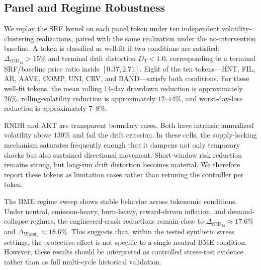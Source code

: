 \documentclass[a4paper,fleqn]{cas-dc}
\begin{document}
\subsection{Panel and Regime Robustness}
\label{sec:exp-generalization}

We replay the SRF kernel on each panel token under ten independent volatility-clustering realizations, paired with the same realization under the no-intervention baseline. A token is classified as well-fit if two conditions are satisfied: \(\Delta_{\mathrm{rDD}_{14}}>15\%\) and terminal drift distortion \(D_T<1.0\), corresponding to a terminal SRF/baseline price ratio inside \([0.37,2.71]\). Eight of the ten tokens---HNT, FIL, AR, AAVE, COMP, UNI, CRV, and BAND---satisfy both conditions. For these well-fit tokens, the mean rolling 14-day drawdown reduction is approximately \(26\%\), rolling-volatility reduction is approximately \(12\)--\(14\%\), and worst-day-loss reduction is approximately \(7\)--\(8\%\).

RNDR and AKT are transparent boundary cases. Both have intrinsic annualized volatility above \(130\%\) and fail the drift criterion. In these cells, the supply-locking mechanism saturates frequently enough that it dampens not only temporary shocks but also sustained directional movement. Short-window risk reduction remains strong, but long-run drift distortion becomes material. We therefore report these tokens as limitation cases rather than retuning the controller per token.

The BME regime sweep shows stable behavior across tokenomic conditions. Under neutral, emission-heavy, burn-heavy, reward-driven inflation, and demand-collapse regimes, the engineered-crash reductions remain close to \(\Delta_{\mathrm{rDD}_{14}}\approx17.6\%\) and \(\Delta_{\mathrm{Worst}_1}\approx18.6\%\). This suggests that, within the tested synthetic stress settings, the protective effect is not specific to a single neutral BME condition. However, these results should be interpreted as controlled stress-test evidence rather than as full multi-cycle historical validation.
\end{document}
